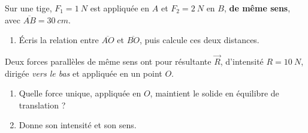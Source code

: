 \documentclass[11pt,a4paper]{article}
\newcommand{\vv}[1]{\vec{#1}}\newcommand{\ds}{\displaystyle}
\begin{document}
\begin{exo}
Sur une tige, $F_1=\qty{1}{N}$ est appliquée en $A$ et $F_2=\qty{2}{N}$ en $B$, \textbf{de même sens},
avec $\overline{AB}=\qty{30}{cm}$.
\begin{center}
\end{center}
\begin{enumerate}[label=\alph*)]
  \item Écris la relation entre $\overline{AO}$ et $\overline{BO}$, puis calcule ces deux distances.
\end{enumerate}
\end{exo}

\begin{exo}
Deux forces parallèles de même sens ont pour résultante $\vv R$, d'intensité $R=\qty{10}{N}$, dirigée
\emph{vers le bas} et appliquée en un point $O$.
\begin{enumerate}[label=\alph*)]
  \item Quelle force unique, appliquée en $O$, maintient le solide en équilibre de translation ?
  \item Donne son intensité et son sens.
\end{enumerate}
\end{exo}
\end{document}
